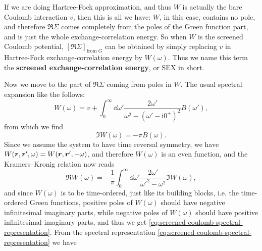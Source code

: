 \documentclass[hyperref, a4paper, 12pt]{report}
\newcommand*{\ii}{\mathrm{i}}
\newcommand*{\concept}[1]{{\textbf{#1}}}
\begin{document}
If we are doing Hartree-Fock approximation,
and thus $W$ is actually the bare Coulomb interaction $v$,
then this is all we have: 
$W$, in this case, contains no pole, 
and therefore $\Re \Sigma$ comes completely from the poles of the Green function part,
and is just the whole exchange-correlation energy.
So when $W$ is the screened Coulomb potential, 
$[\Re \Sigma]_{\text{from $G$}}$ can be obtained by simply 
replacing $v$ in Hartree-Fock exchange-correlation energy by $W(\omega)$.
Thus we name this term the \concept{screened exchange-correlation energy}, 
or SEX in short.

Now we move to the part of $\Re \Sigma$ coming from poles in $W$.
The usual spectral expansion like the follows: 
\begin{equation}
    W(\omega) = v + \int_{0}^{\infty} \dd{\omega'}
    \frac{2 \omega'}{\omega^2 - (\omega' - \ii 0^+)^2} B(\omega'),
    \label{eq:screened-coulomb-spectral-representation}
\end{equation}
from which we find 
\begin{equation}
    \Im W(\omega) = - \pi B(\omega).
\end{equation}
Since we assume the system to have time reversal symmetry, 
we have $W(\vb*{r}, \vb*{r}', \omega) = W(\vb*{r}, \vb*{r}', - \omega)$,
and therefore $W(\omega)$ is an even function, 
and the Kramers–Kronig relation now reads 
\[
    \Re W(\omega) = - \frac{1}{\pi} \int_{0}^{\infty} \dd{\omega'}
    \frac{2 \omega'}{\omega'^2 - \omega^2} \Im W(\omega),
\] 
and since $W(\omega)$ is to be time-ordered, 
just like its building blocks, i.e. the time-ordered Green functions, 
positive poles of $W(\omega)$ should have negative infinitesimal imaginary parts, 
while negative poles of $W(\omega)$ should have positive infinitesimal imaginary parts, 
and thus we get \eqref{eq:screened-coulomb-spectral-representation}.
From the spectral representation \eqref{eq:screened-coulomb-spectral-representation} we have 
\end{document}
